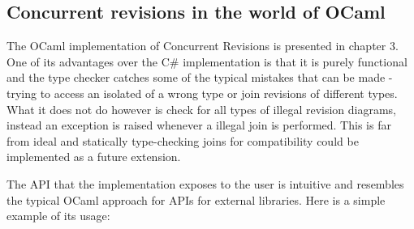 \documentclass[12pt,twoside,notitlepage]{report}
\begin{document}
\subsection{Concurrent revisions in the world of OCaml}
The OCaml implementation of Concurrent Revisions is presented in chapter 3. One of its advantages over the C\# implementation is that it is purely functional and the type checker catches some of the typical mistakes that can be made - trying to access an isolated of a wrong type or join revisions of different types. What it does not do however is check for all types of illegal revision diagrams, instead an exception is raised whenever a illegal join is performed. This is far from ideal and statically type-checking joins for compatibility could be implemented as a future extension.

The API that the implementation exposes to the user is intuitive and resembles the typical OCaml approach for APIs for external libraries. Here is a simple example of its usage:
\begin{comment}
module IntRevision = Make(struct
    type t = int
    let merge head parent current = head + current - parent
  end)

let () =
  let r = IntRevision.init () in
  let res1 = IntRevision.create r 0 in
  let revision = IntRevision.get_revision res1 
   and account = IntRevision.get_isolated res1 in
     Deferred.both 
      (IntRevision.fork revision 
        (fun r -> return (IntRevision.write r account ((IntRevision.read r account) + 5)))
      (IntRevision.fork revision 
        (fun r -> return (IntRevision.write r account ((IntRevision.read r account) + 10)))
     >>|(fun (rev1, rev2 ->
        let join_rev1 = IntRevision.join revision rev1 in
        let join_rev2 = Intrevision.join join_rev1 rev2 in
          assert(IntRevision.read join_rev2 = 15)  
\end{comment}
\end{document}
